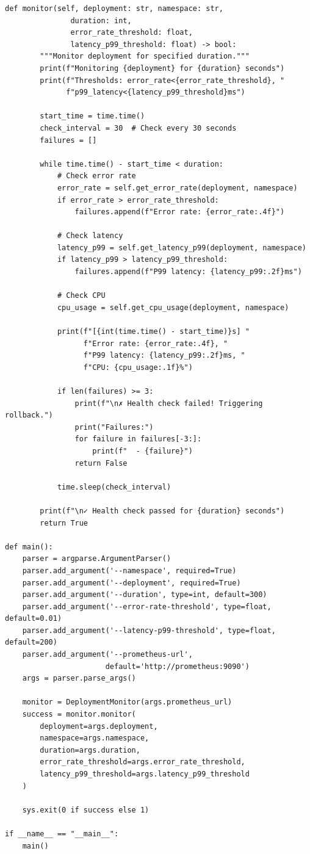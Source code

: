 \begin{lstlisting}[style=python, caption=scripts/monitor_deployment.py]
    def monitor(self, deployment: str, namespace: str,
               duration: int,
               error_rate_threshold: float,
               latency_p99_threshold: float) -> bool:
        """Monitor deployment for specified duration."""
        print(f"Monitoring {deployment} for {duration} seconds")
        print(f"Thresholds: error_rate<{error_rate_threshold}, "
              f"p99_latency<{latency_p99_threshold}ms")

        start_time = time.time()
        check_interval = 30  # Check every 30 seconds
        failures = []

        while time.time() - start_time < duration:
            # Check error rate
            error_rate = self.get_error_rate(deployment, namespace)
            if error_rate > error_rate_threshold:
                failures.append(f"Error rate: {error_rate:.4f}")

            # Check latency
            latency_p99 = self.get_latency_p99(deployment, namespace)
            if latency_p99 > latency_p99_threshold:
                failures.append(f"P99 latency: {latency_p99:.2f}ms")

            # Check CPU
            cpu_usage = self.get_cpu_usage(deployment, namespace)

            print(f"[{int(time.time() - start_time)}s] "
                  f"Error rate: {error_rate:.4f}, "
                  f"P99 latency: {latency_p99:.2f}ms, "
                  f"CPU: {cpu_usage:.1f}%")

            if len(failures) >= 3:
                print(f"\n✗ Health check failed! Triggering rollback.")
                print("Failures:")
                for failure in failures[-3:]:
                    print(f"  - {failure}")
                return False

            time.sleep(check_interval)

        print(f"\n✓ Health check passed for {duration} seconds")
        return True

def main():
    parser = argparse.ArgumentParser()
    parser.add_argument('--namespace', required=True)
    parser.add_argument('--deployment', required=True)
    parser.add_argument('--duration', type=int, default=300)
    parser.add_argument('--error-rate-threshold', type=float, default=0.01)
    parser.add_argument('--latency-p99-threshold', type=float, default=200)
    parser.add_argument('--prometheus-url',
                       default='http://prometheus:9090')
    args = parser.parse_args()

    monitor = DeploymentMonitor(args.prometheus_url)
    success = monitor.monitor(
        deployment=args.deployment,
        namespace=args.namespace,
        duration=args.duration,
        error_rate_threshold=args.error_rate_threshold,
        latency_p99_threshold=args.latency_p99_threshold
    )

    sys.exit(0 if success else 1)

if __name__ == "__main__":
    main()
\end{lstlisting}

